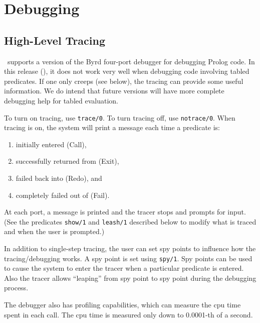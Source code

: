 \chapter{Debugging} \label{debugging}

\section{High-Level Tracing}

\ourprolog\ supports a version of the Byrd four-port debugger for debugging
Prolog code.  In this release (\version), it does not work very well
when debugging code involving tabled predicates.  If one only creeps
(see below), the tracing can provide some useful information.  We do
intend that future versions will have more complete debugging help for
tabled evaluation.

To turn on tracing, use {\tt trace/0}.  To turn tracing off, use 
{\tt notrace/0}.  When tracing is on, the system will print a message each
time a predicate is:
\begin{enumerate} 
\item initially entered (Call), 
\item successfully returned from (Exit), 
\item failed back into (Redo), and
\item completely failed out of (Fail).  
\end{enumerate}
At each port, a message is printed and the tracer stops and prompts
for input.  (See the predicates {\tt show/1} and {\tt leash/1} described
below to modify what is traced and when the user is prompted.)

In addition to single-step tracing, the user can set spy points to influence
how the tracing/debugging works.  A spy point is set using {\tt spy/1}.
Spy points can be used to cause the system to enter the tracer when
a particular predicate is entered. Also the tracer allows ``leaping'' from
spy point to spy point during the debugging process.

The debugger also has profiling capabilities, which can measure the cpu
time spent in each call. The cpu time is measured only down to 0.0001-th
of a second.

